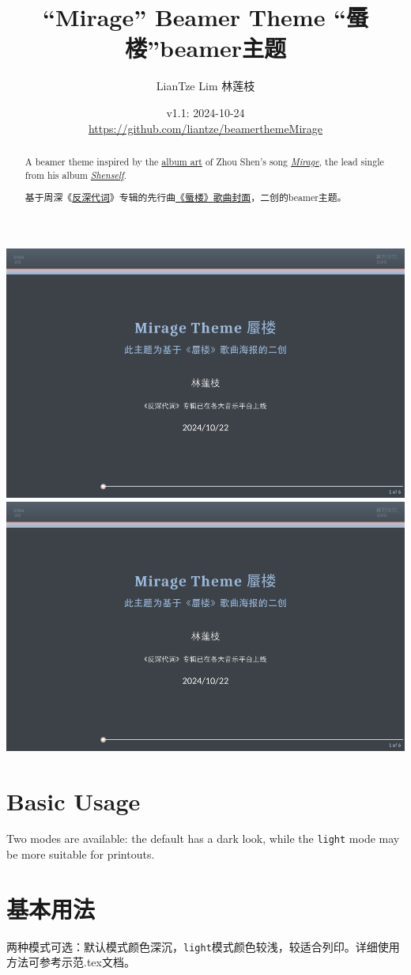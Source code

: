 \documentclass{article}
\title{``Mirage'' Beamer Theme “蜃楼”beamer主题}
\author{LianTze Lim 林莲枝}
\date{v1.1: 2024-10-24\\\url{https://github.com/liantze/beamerthemeMirage}}
\begin{document}
\maketitle

\begin{paracol}{2}
\begin{abstract}
A beamer theme inspired by the
\href{https://www.instagram.com/juncenart/p/C5LuwoSrBnW/?img_index=2}{album art} of Zhou Shen's song \href{https://open.spotify.com/track/1PR9aOkY0dyRRL81YXv9a4}{\emph{Mirage}},
the lead single from his album \href{https://open.spotify.com/album/6IcyslRZfwWzpdhnFML6cd}{\emph{Shenself}}.
\end{abstract}

\switchcolumn

\renewcommand*{\abstractname}{摘要}
\begin{abstract}
基于周深《\href{https://y.qq.com/n/ryqq/albumDetail/003szpvI3LMhQ7}{反深}\href{https://music.163.com/\#/album?id=190605791}{代词}》专辑的先行曲\href{http://xhslink.com/a/oF7IHZ0uUYkY}{《蜃楼》歌曲封面}，二创的beamer主题。
\end{abstract}
\end{paracol}

\begin{center}
\includegraphics[page=1,width=.495\hsize]{main-zh.pdf}
\includegraphics[page=5,width=.495\hsize]{main-zh.pdf}
\end{center}
    
\begin{paracol}{2}
\section{Basic Usage}

Two modes are available: the default has a dark look, while the
\texttt{light} mode may be more suitable for printouts.

\switchcolumn

\section{基本用法}

两种模式可选：默认模式颜色深沉，\texttt{light}模式颜色较浅，较适合列印。详细使用方法可参考示范.tex文档。

\end{paracol}
\end{document}
